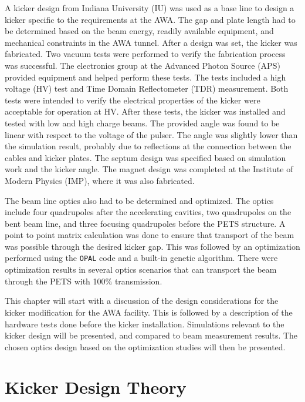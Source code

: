 \documentclass[aps,prab,preprint,groupedaddress,linenumbers]{revtex4-2}
\begin{document}
A kicker design from Indiana University (IU) was used as a base line to design a kicker specific to the
requirements at the AWA. The gap and plate length had to be determined based on the beam energy, 
readily available equipment, and mechanical constraints in the AWA tunnel. 
After a design was set, the kicker was fabricated.
Two vacuum tests were performed to verify the fabrication process was successful.
The electronics group at the Advanced Photon Source (APS) provided equipment and helped perform these tests.
The tests included a high voltage (HV) test and Time Domain Reflectometer (TDR) measurement.
Both tests were intended to verify the electrical properties of the kicker were acceptable for operation at HV.
After these tests, the kicker was installed and tested with low and high charge beams. 
The provided angle was found to be linear with respect to the voltage of the pulser.  
The angle was slightly lower than the simulation result, probably due to reflections at the
connection between the cables and kicker plates. 
The septum design was specified based on simulation work and the kicker angle.
The magnet design was completed at the Institute of Modern Physics (IMP), 
where it was also fabricated. 

The beam line optics also had to be determined and optimized.
The optics include four quadrupoles after the accelerating cavities, 
two quadrupoles on the bent beam line, and three focusing quadrupoles
before the PETS structure.
A point to point matrix calculation was done to ensure that transport of the
beam was possible through the desired kicker gap.  This was followed by an optimization 
performed using the \verb|OPAL| code and a built-in genetic algorithm. 
There were optimization results in several optics scenarios that can transport 
the beam through the PETS with 100\% transmission.  

This chapter will start with a discussion of the design considerations for the kicker modification for the AWA facility.  
This is followed by a description of the hardware tests done before the kicker installation.  
Simulations relevant to the kicker design will be presented, and compared to beam measurement results.  
The chosen optics design based on the optimization studies will then be presented.


\section{Kicker Design Theory} \label{theory}
\end{document}
